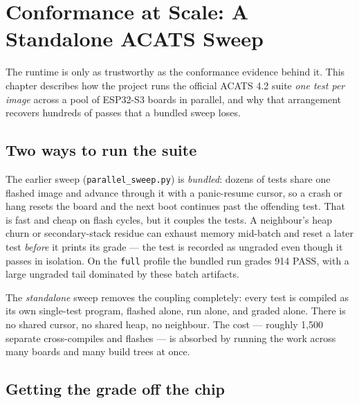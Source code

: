 \chapter{Conformance at Scale: A Standalone ACATS Sweep}
\label{ch:acats-sweep}

The runtime is only as trustworthy as the conformance evidence behind it. This
chapter describes how the project runs the official ACATS 4.2 suite \emph{one test
per image} across a pool of ESP32-S3 boards in parallel, and why that arrangement
recovers hundreds of passes that a bundled sweep loses.

\medskip
\noindent{}
\medskip

\section{Two ways to run the suite}

The earlier sweep (\texttt{parallel\_sweep.py}) is \emph{bundled}: dozens of tests
share one flashed image and advance through it with a panic-resume cursor, so a
crash or hang resets the board and the next boot continues past the offending test.
That is fast and cheap on flash cycles, but it couples the tests. A neighbour's
heap churn or secondary-stack residue can exhaust memory mid-batch and reset a later
test \emph{before} it prints its grade --- the test is recorded as ungraded even
though it passes in isolation. On the \texttt{full} profile the bundled run grades
914 PASS, with a large ungraded tail dominated by these batch artifacts.

The \emph{standalone} sweep removes the coupling completely: every test is compiled
as its own single-test program, flashed alone, run alone, and graded alone. There is
no shared cursor, no shared heap, no neighbour. The cost --- roughly 1{,}500 separate
cross-compiles and flashes --- is absorbed by running the work across many boards and
many build trees at once.

\section{Getting the grade off the chip}

